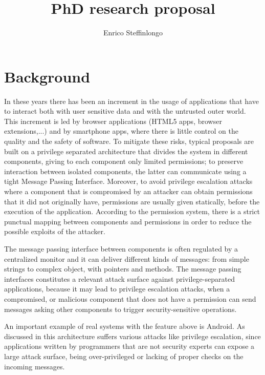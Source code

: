\documentclass[10pt,a4paper,draft]{article}
\author{Enrico Steffinlongo}
\title{PhD research proposal}
\begin{document}
\maketitle
\section*{Background}
In these years there has been an increment in the usage of applications that have to interact both with user sensitive data and with the untrusted outer world. This increment is led by browser applications (HTML5 apps, browser extensions,...) and by smartphone apps, where there is little control on the quality and the safety of software. To mitigate these risks, typical proposals are built on a privilege separated architecture that divides the system in different components, giving to each component only limited permissions; to preserve interaction between isolated components, the latter can communicate using a tight Message Passing Interface. Moreover, to avoid privilege escalation attacks where a component that is compromised by an attacker can obtain permissions that it did not originally have, permissions are usually given statically, before the execution of the application. According to the permission system, there is a strict punctual mapping between components and permissions in order to reduce the possible exploits of the attacker.

The message passing interface between components is often regulated by a centralized monitor and it can deliver different kinds of messages: from simple strings to complex object, with pointers and methods. The message passing interfaces constitutes a relevant attack surface against privilege-separated applications, because it may lead to privilege escalation attacks, when a compromised, or malicious component that does not have a permission can send messages asking other components to trigger security-sensitive operations.

An important example of real systems with the feature above is Android. As discussed in \cite{AndroidMPI,AndroidPermissions,AndroidPermission,AndroidPrivilegeEscalation,AndroidRedelegation} this architecture suffers various attacks like privilege escalation, since applications written by programmers that are not security experts can expose a large attack surface, being over-privileged or lacking of proper checks on the incoming messages.
\end{document}
